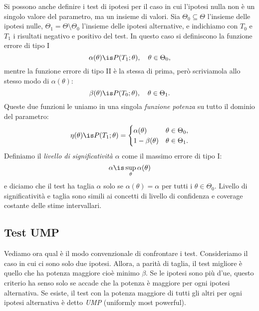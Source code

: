 Si possono anche definire i test di ipotesi per il caso in cui l'ipotesi nulla
non è un singolo valore del parametro, ma un insieme di valori. Sia $\Theta_0
\subseteq \Theta$ l'insieme delle ipotesi nulle, $\Theta_1 = \Theta \setminus
\Theta_0$ l'insieme delle ipotesi alternative, e indichiamo con $T_0$ e $T_1$ i
risultati negativo e positivo del test. In questo caso si definiscono la
funzione errore di tipo I
%
\begin{equation*}
    \alpha(\theta) \is P(T_1; \theta), \quad \theta \in \Theta_0,
\end{equation*}
%
mentre la funzione errore di tipo II è la stessa di prima, però scriviamola
allo stesso modo di $\alpha(\theta)$:
%
\begin{equation*}
    \beta(\theta) \is P(T_0; \theta), \quad \theta \in \Theta_1.
\end{equation*}
%
Queste due funzioni le uniamo in una singola \emph{funzione potenza} su tutto
il dominio del parametro:
%
\begin{equation*}
    \eta(\theta) \is P(T_1; \theta)
    = \begin{cases}
        \alpha(\theta) & \theta \in \Theta_0, \\
        1 - \beta(\theta) & \theta \in \Theta_1.
    \end{cases}
\end{equation*}
%
Definiamo il \emph{livello di significatività $\alpha$} come il massimo errore
di tipo I:
%
\begin{equation*}
    \alpha \is \sup_\theta \alpha(\theta)
\end{equation*}
%
e diciamo che il test ha taglia $\alpha$ solo se $\alpha(\theta) = \alpha$ per
tutti i $\theta \in \Theta_0$. Livello di significatività e taglia sono simili
ai concetti di livello di confidenza e coverage costante delle stime
intervallari.

\subsection{Test UMP}

Vediamo ora qual è il modo convenzionale di confrontare i test.
Consideriamo il caso in cui ci sono solo due ipotesi.
Allora, a parità di taglia,
il test migliore è quello che ha potenza maggiore cioè minimo $\beta$.
Se le ipotesi sono più d'ue,
questo criterio ha senso solo se accade che la potenza è maggiore per ogni ipotesi alternativa.
Se esiste, il test con la potenza maggiore di tutti gli altri per ogni ipotesi alternativa è detto
\emph{UMP} (uniformly most powerful).

